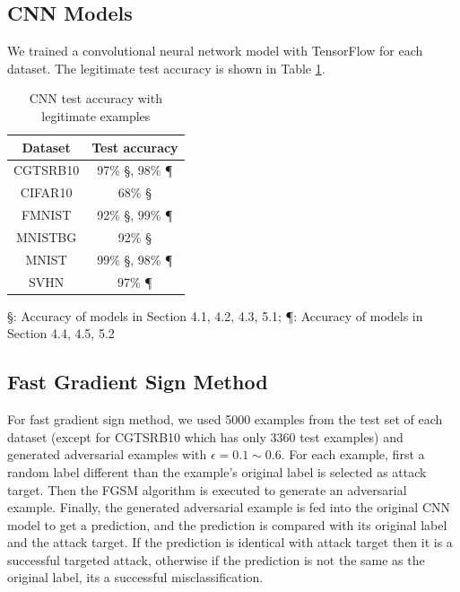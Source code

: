 \documentclass{article}
\begin{document}
\subsection{CNN Models}

We trained a convolutional neural network model with TensorFlow\cite{tensorflow} for each dataset.
The legitimate test accuracy is shown in Table \ref{tab:cnnaccuracy}.

\begin{table}
\centering
\begin{tabular}{cc}
    \toprule
    Dataset & Test accuracy \\
    \midrule
    CGTSRB10 & 97\% \S, 98\% \P \\
    CIFAR10 & 68\% \S \\
    FMNIST & 92\% \S, 99\% \P \\
    MNISTBG & 92\% \S \\
    MNIST & 99\% \S, 98\% \P \\
    SVHN & 97\% \P \\
    \bottomrule
\end{tabular}
\begin{tablenotes}
    \item \S: Accuracy of models in Section 4.1, 4.2, 4.3, 5.1; \P: Accuracy of models in Section 4.4, 4.5, 5.2
\end{tablenotes}
\caption{\label{tab:cnnaccuracy} CNN test accuracy with legitimate examples}
\end{table}


\subsection{Fast Gradient Sign Method}

For fast gradient sign method, we used 5000 examples from the test set of each dataset (except for CGTSRB10 which has only 3360 test examples)
and generated adversarial examples with \(\epsilon=0.1 \sim 0.6\).
For each example, first a random label different than the example's original label is selected as attack target.
Then the FGSM algorithm is executed to generate an adversarial example.
Finally, the generated adversarial example is fed into the original CNN model to get a prediction,
and the prediction is compared with its original label and the attack target.
If the prediction is identical with attack target then it is a successful targeted attack,
otherwise if the prediction is not the same as the original label, its a successful misclassification.
\end{document}
